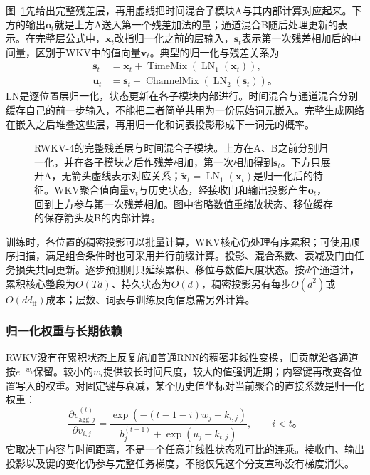 图~\ref{fig:rnn-rwkv}先给出完整残差层，再用虚线把时间混合子模块A与其内部计算对应起来。下方的输出$\bm o_t$就是上方A送入第一个残差加法的量；通道混合B随后处理更新的表示。在完整层公式中，$\bm x_t$改指归一化之前的层输入，$\bm s_t$表示第一次残差相加后的中间量，区别于WKV中的值向量$\bm v_t$。典型的归一化与残差关系为
\begin{equation}
  \begin{aligned}
    \bm s_t&=\bm x_t+\operatorname{TimeMix}
                    (\operatorname{LN}_1(\bm x_t)),\\
    \bm u_t&=\bm s_t+\operatorname{ChannelMix}
                    (\operatorname{LN}_2(\bm s_t))\text{。}
  \end{aligned}
  \label{eq:rnn-rwkv-residual-layer}
\end{equation}
LN是逐位置层归一化，状态更新在各子模块内部进行。时间混合与通道混合分别缓存自己的前一步输入，不能把二者简单共用为一份原始词元嵌入。完整生成网络在嵌入之后堆叠这些层，再用归一化和词表投影形成下一词元的概率。
\begin{figure}[p]
  \centering
  
  \caption{RWKV-4的完整残差层与时间混合子模块。上方在A、B之前分别归一化，并在各子模块之后作残差相加，第一次相加得到$\bm s_t$。下方只展开A，无箭头虚线表示对应关系；$\widetilde{\bm x}_t=\operatorname{LN}_1(\bm x_t)$是归一化后的特征。WKV聚合值向量$\bm v_t$与历史状态，经接收门和输出投影产生$\bm o_t$，回到上方参与第一次残差相加。图中省略数值重缩放状态、移位缓存的保存箭头及B的内部计算。}
  \label{fig:rnn-rwkv}
\end{figure}

训练时，各位置的稠密投影可以批量计算，WKV核心仍处理有序累积；可使用顺序扫描，满足组合条件时也可采用并行前缀计算。投影、混合系数、衰减及门由任务损失共同更新。逐步预测则只延续累积、移位与数值尺度状态。按$d$个通道计，累积核心整段为$O(Td)$、持久状态为$O(d)$，稠密投影另有每步$O(d^2)$或$O(dd_{\mathrm{ff}})$成本；层数、词表与训练反向信息需另外计算。

\subsubsection{归一化权重与长期依赖}
\label{sec:rnn-rwkv-long-memory}

RWKV没有在累积状态上反复施加普通RNN的稠密非线性变换，旧贡献沿各通道按$e^{-w_i}$保留。较小的$w_i$提供较长时间尺度，较大的值强调近期；内容键再改变各位置写入的权重。对固定键与衰减，某个历史值坐标对当前聚合的直接系数是归一化权重：
\begin{equation}
  \frac{\partial v_{\mathrm{agg},j}^{(t)}}{\partial v_{i,j}}
     =\frac{\exp(-(t-1-i)w_j+k_{i,j})}
       {b_j^{(t-1)}+\exp(u_j+k_{t,j})},\qquad i<t\text{。}
  \label{eq:rnn-rwkv-value-gradient}
\end{equation}
它取决于内容与时间距离，不是一个任意非线性状态雅可比的连乘。接收门、输出投影以及键的变化仍参与完整任务梯度，不能仅凭这个分支宣称没有梯度消失。

